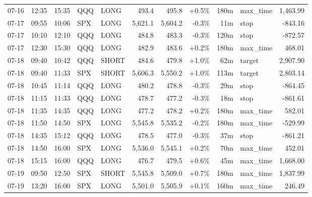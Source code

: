 \documentclass[11pt,a4paper,twoside]{article}
\begin{document}
\begin{center}
\begin{longtable}{>{\color{txtmain}}l l l l l r r r r >{\color{txtmain}}l r}
07-16 & 12:35 & 15:35 & QQQ & LONG & 493.4 & 495.8 & \textcolor{wingreen}{+0.5\%} & 180m & max\_time & \textcolor{wingreen}{1,463.99} \\
07-17 & 09:55 & 10:06 & SPX & LONG & 5,621.1 & 5,604.2 & \textcolor{lossred}{-0.3\%} & 11m & stop & \textcolor{lossred}{-843.16} \\
07-17 & 10:10 & 12:10 & QQQ & LONG & 484.8 & 483.3 & \textcolor{lossred}{-0.3\%} & 120m & stop & \textcolor{lossred}{-872.57} \\
07-17 & 12:30 & 15:30 & QQQ & LONG & 482.9 & 483.6 & \textcolor{wingreen}{+0.2\%} & 180m & max\_time & \textcolor{wingreen}{468.01} \\
07-18 & 09:40 & 10:42 & QQQ & SHORT & 484.6 & 479.8 & \textcolor{wingreen}{+1.0\%} & 62m & target & \textcolor{wingreen}{2,907.90} \\
07-18 & 09:40 & 11:33 & SPX & SHORT & 5,606.3 & 5,550.2 & \textcolor{wingreen}{+1.0\%} & 113m & target & \textcolor{wingreen}{2,803.14} \\
07-18 & 10:45 & 11:14 & QQQ & LONG & 480.2 & 478.8 & \textcolor{lossred}{-0.3\%} & 29m & stop & \textcolor{lossred}{-864.45} \\
07-18 & 11:15 & 11:33 & QQQ & LONG & 478.7 & 477.2 & \textcolor{lossred}{-0.3\%} & 18m & stop & \textcolor{lossred}{-861.61} \\
07-18 & 11:35 & 14:35 & QQQ & LONG & 477.2 & 478.2 & \textcolor{wingreen}{+0.2\%} & 180m & max\_time & \textcolor{wingreen}{582.01} \\
07-18 & 11:50 & 14:50 & SPX & LONG & 5,545.8 & 5,535.2 & \textcolor{lossred}{-0.2\%} & 180m & max\_time & \textcolor{lossred}{-529.99} \\
07-18 & 14:35 & 15:12 & QQQ & LONG & 478.5 & 477.0 & \textcolor{lossred}{-0.3\%} & 37m & stop & \textcolor{lossred}{-861.21} \\
07-18 & 14:50 & 16:00 & SPX & LONG & 5,536.0 & 5,545.1 & \textcolor{wingreen}{+0.2\%} & 70m & max\_time & \textcolor{wingreen}{452.01} \\
07-18 & 15:15 & 16:00 & QQQ & LONG & 476.7 & 479.5 & \textcolor{wingreen}{+0.6\%} & 45m & max\_time & \textcolor{wingreen}{1,668.00} \\
07-19 & 09:50 & 12:50 & SPX & SHORT & 5,545.8 & 5,509.0 & \textcolor{wingreen}{+0.7\%} & 180m & max\_time & \textcolor{wingreen}{1,837.99} \\
07-19 & 13:20 & 16:00 & SPX & LONG & 5,501.0 & 5,505.9 & \textcolor{wingreen}{+0.1\%} & 160m & max\_time & \textcolor{wingreen}{246.49} \\

\end{longtable}
\end{center}
\end{document}
